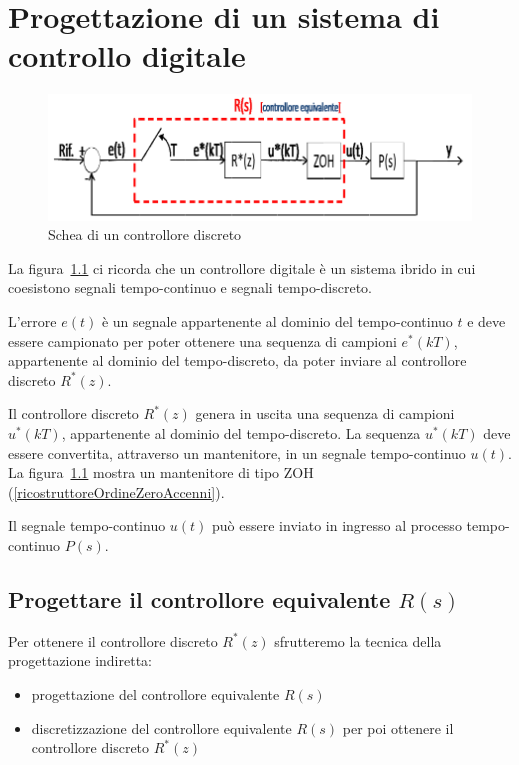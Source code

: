 \documentclass[a4paper]{report}
\begin{document}
\chapter{Progettazione di un sistema di controllo digitale}
\begin{figure}[!h]
  \begin{center}
    \includegraphics[scale=0.4]{./figures/controlloreEquivalente.png}
    \caption{Schea di un controllore
      discreto}\label{fig:controlloreEquivalente}
  \end{center}
\end{figure}
La figura~\ref{fig:controlloreEquivalente} ci ricorda che un
controllore digitale \`e un sistema ibrido in cui coesistono segnali
tempo-continuo e segnali tempo-discreto.

L'errore $e(t)$ \`e un segnale appartenente al dominio del
tempo-continuo $t$ e deve essere campionato per poter ottenere una
sequenza di campioni $e^{*}(kT)$, appartenente al dominio del
tempo-discreto, da poter inviare al controllore discreto $R^{*}(z)$.

Il controllore discreto $R^{*}(z)$ genera in uscita una sequenza di
campioni $u^{*}(kT)$, appartenente al dominio del tempo-discreto. La
sequenza $u^{*}(kT)$ deve essere convertita, attraverso un
mantenitore, in un segnale tempo-continuo $u(t)$. La
figura~\ref{fig:controlloreEquivalente} mostra un mantenitore di tipo
ZOH (\ref{ricostruttoreOrdineZeroAccenni}).

Il segnale tempo-continuo $u(t)$ pu\`o essere inviato in ingresso al
processo tempo-continuo $P(s)$.

\section{Progettare il controllore equivalente $R(s)$}
Per ottenere il controllore discreto $R^{*}(z)$ sfrutteremo la tecnica
della progettazione indiretta:
\begin{itemize}
\item progettazione del controllore equivalente $R(s)$
\item discretizzazione del controllore equivalente $R(s)$ per poi
  ottenere il controllore discreto $R^{*}(z)$
\end{itemize}
\end{document}
